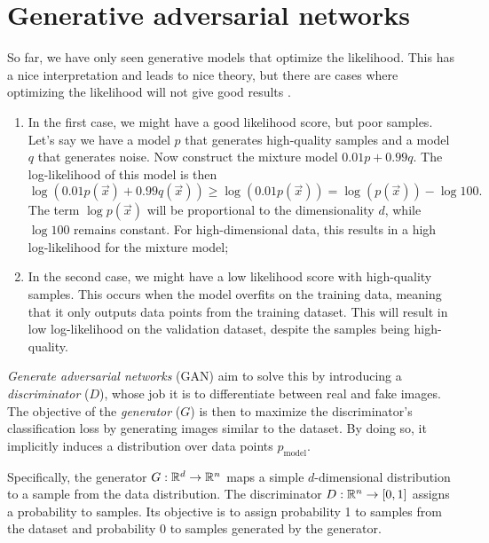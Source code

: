 \section{Generative adversarial networks}

So far, we have only seen generative models that optimize the likelihood. This has a nice
interpretation and leads to nice theory, but there are cases where optimizing the likelihood will
not give good results \citep{theis2016note}.

\begin{enumerate}
    \item In the first case, we might have a good likelihood score, but poor samples. Let's say we have a
          model $p$ that generates high-quality samples and a model $q$ that generates noise. Now construct
          the mixture model $0.01 p + 0.99 q$. The log-likelihood of this model is then \[
              \log(0.01 p(\vec{x}) + 0.99 q(\vec{x})) \geq \log (0.01 p(\vec{x})) = \log(p(\vec{x})) - \log 100.
          \]
          The term $\log p(\vec{x})$ will be proportional to the dimensionality $d$, while $\log 100$ remains
          constant. For high-dimensional data, this results in a high log-likelihood for the mixture model;

    \item In the second case, we might have a low likelihood score with high-quality samples. This occurs
          when the model overfits on the training data, meaning that it only outputs data points from the
          training dataset. This will result in low log-likelihood on the validation dataset, despite the
          samples being high-quality.

\end{enumerate}

\textit{Generate adversarial networks} (GAN) \citep{goodfellow2014generative} aim to solve this by
introducing a \textit{discriminator} ($D$), whose job it is to differentiate between real and fake
images. The objective of the \textit{generator} ($G$) is then to maximize the discriminator's
classification loss by generating images similar to the dataset. By doing so, it implicitly induces a
distribution over data points $p_{\mathrm{model}}$.

Specifically, the generator $G: \mathbb{R}^d \to \mathbb{R}^n$ maps a simple $d$-dimensional distribution to a
sample from the data distribution. The discriminator $D: \mathbb{R}^n \to [0,1]$ assigns a probability to
samples. Its objective is to assign probability 1 to samples from the dataset and probability 0 to
samples generated by the generator.

